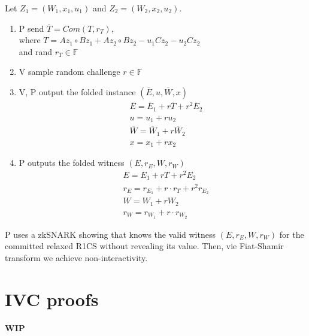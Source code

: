 \documentclass{article}
\theoremstyle{definition}
\begin{document}
Let $Z_1 = (W_1, x_1, u_1)$ and $Z_2 = (W_2, x_2, u_2)$.

\begin{enumerate}
	\item P send $\overline{T} = Com(T, r_T)$,\\
		where $T=A z_1 \circ B z_1 + A z_2 \circ B z_2 - u_1 C z_2 - u_2 C z_2$\\
		and rand $r_T \in \mathbb{F}$
	\item V sample random challenge $r \in \mathbb{F}$
	\item V, P output the folded instance $(\overline{E}, u, \overline{W}, x)$
		\begin{align*}
			&\overline{E}=\overline{E}_1 + r \overline{T} + r^2 \overline{E}_2\\
			&u = u_1 + r u_2\\
			&\overline{W} = \overline{W}_1 + r \overline{W}_2\\
			&x = x_1 + r x_2
		\end{align*}
	\item P outputs the folded witness $(E, r_E, W, r_W)$
		\begin{align*}
			&E = E_1 + r T + r^2 E_2\\
			&r_E = r_{E_1} + r \cdot r_T + r^2 r_{E_2}\\
			&W=W_1 + r W_2\\
			&r_W = r_{W_1} + r \cdot r_{W_2}
		\end{align*}
\end{enumerate}

P uses a zkSNARK showing that knows the valid witness $(E, r_E, W, r_W)$ for the committed relaxed R1CS without revealing its value.
Then, vie Fiat-Shamir transform we achieve non-interactivity.

\section{IVC proofs}
\textbf{WIP}




\end{document}
